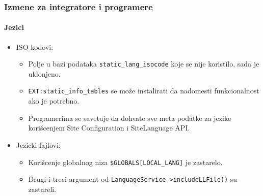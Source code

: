\begin{frame}[fragile]
	\frametitle{Izmene za integratore i programere}
	\framesubtitle{Jezici}

	\begin{itemize}
		\item ISO kodovi:

			\begin{itemize}
				\item Polje u bazi podataka \texttt{static\_lang\_isocode} koje se nije koristilo, sada je uklonjeno.
				\item \texttt{EXT:static\_info\_tables} se može instalirati da nadomesti funkcionalnost ako je potrebno.
				\item Programerima se savetuje da dohvate sve meta podatke za jezike korišcenjem
				Site Configuration i SiteLanguage API.
			\end{itemize}

		\item Jezicki fajlovi:

			\begin{itemize}
				\item Korišcenje globalnog niza \texttt{\$GLOBALS[LOCAL\_LANG]} je zastarelo.
				\item Drugi i treci argument od \texttt{LanguageService->includeLLFile()} su zastareli.
			\end{itemize}

	\end{itemize}

\end{frame}


